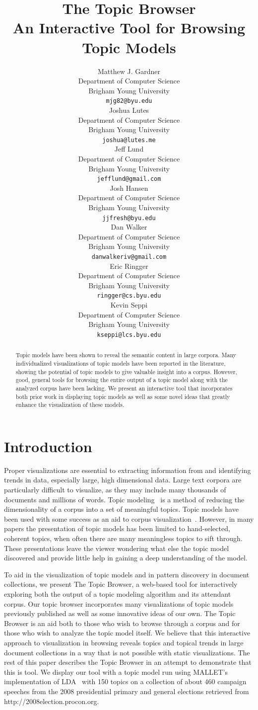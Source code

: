 \documentclass{article}
\title{The Topic Browser\\An Interactive Tool for Browsing Topic Models}
\author{
Matthew J. Gardner \\
Department of Computer Science \\
Brigham Young University \\
\texttt{mjg82@byu.edu} \\
\And
Joshua Lutes \\
Department of Computer Science \\
Brigham Young University \\
\texttt{joshua@lutes.me} \\
\And
Jeff Lund \\
Department of Computer Science \\
Brigham Young University \\
\texttt{jefflund@gmail.com} \\
\And
Josh Hansen \\
Department of Computer Science \\
Brigham Young University \\
\texttt{jjfresh@byu.edu} \\
\And
Dan Walker \\
Department of Computer Science \\
Brigham Young University \\
\texttt{danwalkeriv@gmail.com} \\
\And
Eric Ringger \\
Department of Computer Science \\
Brigham Young University \\
\texttt{ringger@cs.byu.edu} \\
\And
Kevin Seppi \\
Department of Computer Science \\
Brigham Young University \\
\texttt{kseppi@lcs.byu.edu} \\
}
\begin{document}
\nipsfinalcopy %
\maketitle

\begin{abstract}

Topic models have been shown to reveal the semantic content in large corpora.
Many individualized visualizations of topic models have been reported in the
literature, showing the potential of topic models to give valuable insight into
a corpus.  However, good, general tools for browsing the entire output of a
topic model along with the analyzed corpus have been lacking.  We present an
interactive tool that incorporates both prior work in displaying topic models
as well as some novel ideas that greatly enhance the visualization of these
models.

\end{abstract}

\section{Introduction}

Proper visualizations are essential to extracting information from and
identifying trends in data, especially large, high dimensional data.  Large
text corpora are particularly difficult to visualize, as they may include many
thousands of documents and millions of words.  Topic
modeling~\cite{blei-2003-latent-dirichlet-allocation} is a method of reducing
the dimensionality of a corpus into a set of meaningful topics.  Topic models
have been used with some success as an aid to corpus
visualization~\cite{blei-2009-topic-models,
newman-2010-visualizing-with-topic-maps}.  However, in many papers the
presentation of topic models has been limited to hand-selected, coherent
topics, when often there are many meaningless topics to sift through.  These
presentations leave the viewer wondering what else the topic model discovered
and provide little help in gaining a deep understanding of the model.

To aid in the visualization of topic models and in pattern discovery in
document collections, we present The Topic Browser, a web-based tool for
interactively exploring both the output of a topic modeling algorithm and its
attendant corpus.  Our topic browser incorporates many visualizations of topic
models previously published as well as some innovative ideas of our own.  The
Topic Browser is an aid both to those who wish to browse through a corpus and
for those who wish to analyze the topic model itself.  We believe that this
interactive approach to visualization in browsing reveals topics and topical
trends in large document collections in a way that is not possible with static
visualizations.  The rest of this paper describes the Topic Browser in an
attempt to demonstrate that this is tool.  We display our tool with a topic
model run using MALLET's implementation of LDA~\cite{mallet} with 150 topics on
a collection of about 460 campaign speeches from the 2008 presidential primary
and general elections retrieved from http://2008election.procon.org.
\end{document}
